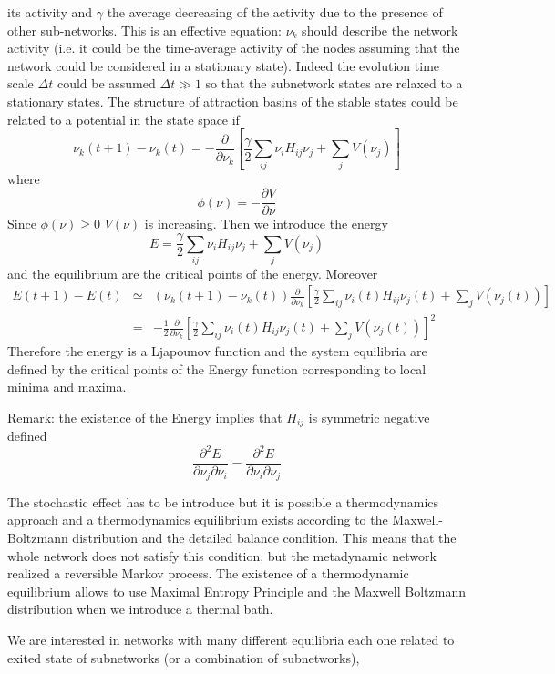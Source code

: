 its activity and $\gamma$ the average decreasing of the activity due to the presence of other sub-networks.
This is an effective equation: $\nu_k$ should describe the network activity (i.e. it could be the time-average activity of the nodes
assuming that the network could be considered in a stationary state). Indeed the evolution time scale $\Delta t$ could be assumed
$\Delta t\gg 1$ so that the subnetwork states are relaxed to a stationary states. 
The structure of attraction basins of the stable states could be related to a potential in the state space if
$$
\nu_k(t+1)-\nu_k(t)=-\frac{\partial }{\partial \nu_k}\left [ \frac{\gamma}{2} \sum_{ij}\nu_i H_{ij}\nu_j+\sum_j V(\nu_j)\right ]
$$
where 
$$
\phi(\nu)=-\frac{\partial V}{\partial \nu}
$$
Since $\phi(\nu)\ge 0$ $V(\nu)$ is increasing. Then we introduce the energy
$$
E=\frac{\gamma}{2} \sum_{ij}\nu_i H_{ij}\nu_j+\sum_j V(\nu_j)
$$
and the equilibrium are the critical points of the energy. Moreover 
\begin{eqnarray}
E(t+1)-E(t)&\simeq& (\nu_k(t+1)-\nu_k(t))\frac{\partial}{\partial \nu_k}\left [\frac{\gamma}{2} \sum_{ij}\nu_i(t) H_{ij}\nu_j(t)+\sum_j V(\nu_j(t))\right ]\nonumber \\
&=& -\frac{1}{2}\frac{\partial}{\partial \nu_k}\left [ \frac{\gamma}{2} \sum_{ij}\nu_i(t) H_{ij}\nu_j(t)+\sum_j V(\nu_j(t)) \right ]^2\nonumber
\end{eqnarray}
Therefore the energy is a Ljapounov function and the system equilibria are defined by the critical points of the Energy function
corresponding to local minima and maxima.\par\noindent
Remark: the existence of the Energy implies that $H_{ij}$ is symmetric negative defined
$$
\frac{\partial^2 E}{\partial \nu_j \partial \nu_i}=\frac{\partial^2 E}{\partial \nu_i \partial \nu_j}
$$
\par\noindent
The stochastic effect has to be introduce but it is possible a thermodynamics approach and a thermodynamics equilibrium exists
according to the Maxwell-Boltzmann distribution and the detailed balance condition. This means that the whole network does not
satisfy this condition, but the metadynamic network realized a reversible Markov process. The existence of a thermodynamic equilibrium
allows to use Maximal Entropy Principle and the Maxwell Boltzmann distribution when we introduce a thermal bath. 
\par\noindent
We are interested in networks with many different equilibria each one related to exited state of subnetworks (or a combination of subnetworks), 
